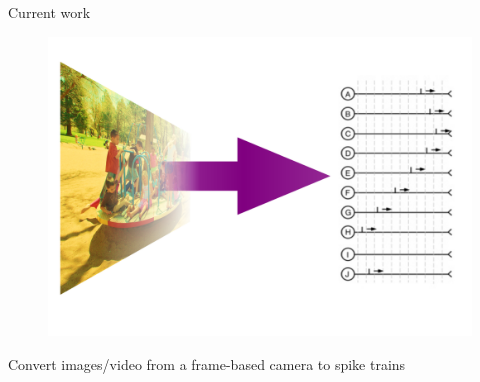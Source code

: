 \documentclass[17pt,mathserif]{beamer}
\begin{document}
            
        
    \begin{frame}{Current work}
        \vspace*{-4em}
        \begin{figure}
            \includegraphics[scale=0.3]{./images-to-spikes}
        \end{figure}
        \vspace*{-0.4em}
        \hspace*{0.05\textwidth}
        \begin{minipage}{0.9\textwidth}
          \centering \small Convert images/video from a frame-based camera to spike trains
        \end{minipage}
    \end{frame}
\end{document}
